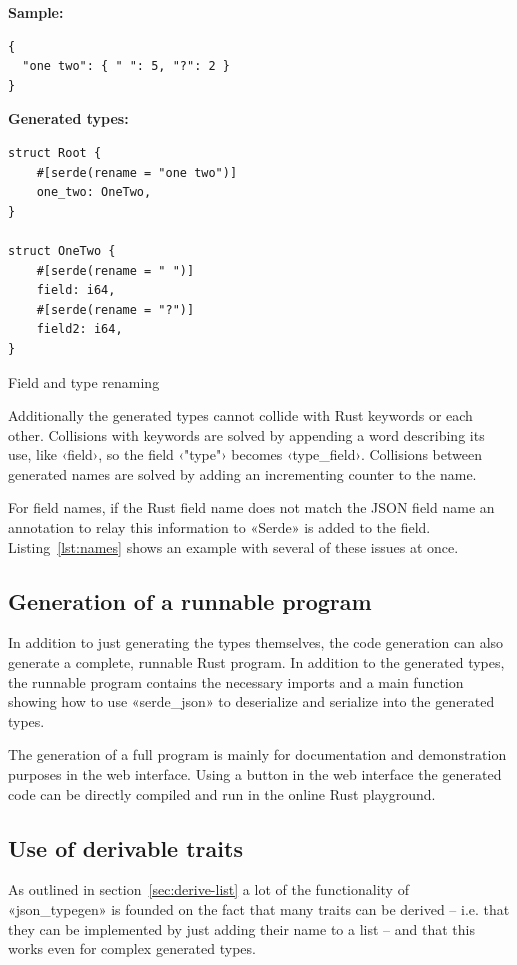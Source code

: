 \begin{listing}[ht!]
\textbf{Sample:}
\begin{verbatim}
{
  "one two": { " ": 5, "?": 2 }
}
\end{verbatim}
\vspace{5mm}

\textbf{Generated types:}
\begin{verbatim}
struct Root {
    #[serde(rename = "one two")]
    one_two: OneTwo,
}

struct OneTwo {
    #[serde(rename = " ")]
    field: i64,
    #[serde(rename = "?")]
    field2: i64,
}
\end{verbatim}
\caption{Field and type renaming}
\label{lst:names}
\end{listing}

Additionally the generated types cannot collide with Rust keywords or each other. Collisions with keywords are solved by appending a word describing its use, like ‹field›, so the field ‹"type"› becomes ‹type_field›. Collisions between generated names are solved by adding an incrementing counter to the name.

For field names, if the Rust field name does not match the JSON field name an annotation to relay this information to «Serde» is added to the field. Listing~\ref{lst:names} shows an example with several of these issues at once.

\subsection{Generation of a runnable program}

In addition to just generating the types themselves, the code generation can also generate a complete, runnable Rust program. In addition to the generated types, the runnable program contains the necessary imports and a main function showing how to use «serde_json» to deserialize and serialize into the generated types.

The generation of a full program is mainly for documentation and demonstration purposes in the web interface. Using a button in the web interface the generated code can be directly compiled and run in the online Rust playground.

\subsection{Use of derivable traits}
\label{sec:use-of-derivable-traits}

As outlined in section~\ref{sec:derive-list} a lot of the functionality of «json_typegen» is founded on the fact that many traits can be derived -- i.e. that they can be implemented by just adding their name to a list -- and that this works even for complex generated types.

